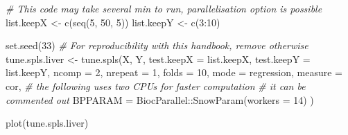 \documentclass[
]{book}
\newenvironment{Shaded}{\begin{snugshade}}{\end{snugshade}}
\newcommand{\AttributeTok}[1]{\textcolor[rgb]{0.77,0.63,0.00}{#1}}
\newcommand{\CommentTok}[1]{\textcolor[rgb]{0.56,0.35,0.01}{\textit{#1}}}
\newcommand{\DecValTok}[1]{\textcolor[rgb]{0.00,0.00,0.81}{#1}}
\newcommand{\FunctionTok}[1]{\textcolor[rgb]{0.00,0.00,0.00}{#1}}
\newcommand{\NormalTok}[1]{#1}
\newcommand{\OtherTok}[1]{\textcolor[rgb]{0.56,0.35,0.01}{#1}}
\newcommand{\SpecialCharTok}[1]{\textcolor[rgb]{0.00,0.00,0.00}{#1}}
\newcommand{\StringTok}[1]{\textcolor[rgb]{0.31,0.60,0.02}{#1}}
\begin{document}
\begin{Shaded}
\begin{Highlighting}[]
\CommentTok{\# This code may take several min to run, parallelisation option is possible}
\NormalTok{list.keepX }\OtherTok{\textless{}{-}} \FunctionTok{c}\NormalTok{(}\FunctionTok{seq}\NormalTok{(}\DecValTok{5}\NormalTok{, }\DecValTok{50}\NormalTok{, }\DecValTok{5}\NormalTok{))}
\NormalTok{list.keepY }\OtherTok{\textless{}{-}} \FunctionTok{c}\NormalTok{(}\DecValTok{3}\SpecialCharTok{:}\DecValTok{10}\NormalTok{)}

\FunctionTok{set.seed}\NormalTok{(}\DecValTok{33}\NormalTok{)  }\CommentTok{\# For reproducibility with this handbook, remove otherwise}
\NormalTok{tune.spls.liver }\OtherTok{\textless{}{-}} \FunctionTok{tune.spls}\NormalTok{(X, Y, }\AttributeTok{test.keepX =}\NormalTok{ list.keepX, }
                             \AttributeTok{test.keepY =}\NormalTok{ list.keepY, }\AttributeTok{ncomp =} \DecValTok{2}\NormalTok{, }
                             \AttributeTok{nrepeat =} \DecValTok{1}\NormalTok{, }\AttributeTok{folds =} \DecValTok{10}\NormalTok{, }\AttributeTok{mode =} \StringTok{\textquotesingle{}regression\textquotesingle{}}\NormalTok{, }
                             \AttributeTok{measure =} \StringTok{\textquotesingle{}cor\textquotesingle{}}\NormalTok{, }
                            \CommentTok{\#   the following uses two CPUs for faster computation}
                            \CommentTok{\# it can be commented out}
                            \AttributeTok{BPPARAM =}\NormalTok{ BiocParallel}\SpecialCharTok{::}\FunctionTok{SnowParam}\NormalTok{(}\AttributeTok{workers =} \DecValTok{14}\NormalTok{)}
\NormalTok{                            )}

\FunctionTok{plot}\NormalTok{(tune.spls.liver)}
\end{Highlighting}
\end{Shaded}
\end{document}
